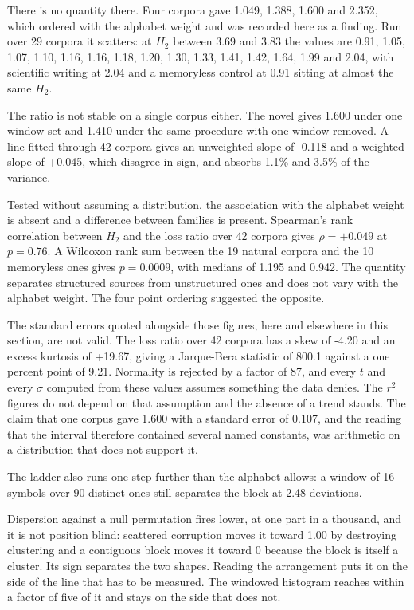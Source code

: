 There is no quantity there. Four corpora gave 1.049, 1.388, 1.600 and 2.352, which ordered with the alphabet weight and was recorded here as a finding. Run over 29 corpora it scatters: at \(H_2\) between 3.69 and 3.83 the values are 0.91, 1.05, 1.07, 1.10, 1.16, 1.16, 1.18, 1.20, 1.30, 1.33, 1.41, 1.42, 1.64, 1.99 and 2.04, with scientific writing at 2.04 and a memoryless control at 0.91 sitting at almost the same \(H_2\).

The ratio is not stable on a single corpus either. The novel gives 1.600 under one window set and 1.410 under the same procedure with one window removed. A line fitted through 42 corpora gives an unweighted slope of -0.118 and a weighted slope of +0.045, which disagree in sign, and absorbs 1.1\% and 3.5\% of the variance.

Tested without assuming a distribution, the association with the alphabet weight is absent and a difference between families is present. Spearman's rank correlation between \(H_2\) and the loss ratio over 42 corpora gives \(\rho = +0.049\) at \(p = 0.76\). A Wilcoxon rank sum between the 19 natural corpora and the 10 memoryless ones gives \(p = 0.0009\), with medians of 1.195 and 0.942. The quantity separates structured sources from unstructured ones and does not vary with the alphabet weight. The four point ordering suggested the opposite.

The standard errors quoted alongside those figures, here and elsewhere in this section, are not valid. The loss ratio over 42 corpora has a skew of -4.20 and an excess kurtosis of +19.67, giving a Jarque-Bera statistic of 800.1 against a one percent point of 9.21. Normality is rejected by a factor of 87, and every \(t\) and every \(\sigma\) computed from these values assumes something the data denies. The \(r^2\) figures do not depend on that assumption and the absence of a trend stands. The claim that one corpus gave 1.600 with a standard error of 0.107, and the reading that the interval therefore contained several named constants, was arithmetic on a distribution that does not support it.

The ladder also runs one step further than the alphabet allows: a window of 16 symbols over 90 distinct ones still separates the block at 2.48 deviations.

Dispersion against a null permutation fires lower, at one part in a thousand, and it is not position blind: scattered corruption moves it toward 1.00 by destroying clustering and a contiguous block moves it toward 0 because the block is itself a cluster. Its sign separates the two shapes. Reading the arrangement puts it on the side of the line that has to be measured. The windowed histogram reaches within a factor of five of it and stays on the side that does not.

